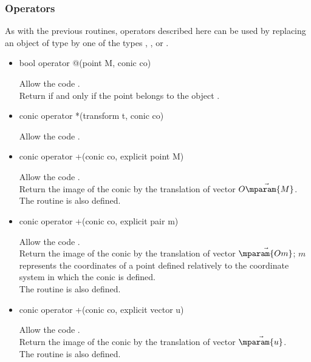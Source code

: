 \documentclass[pdftex]{article}
\newcommand{\ssi}{if and only if\xspace}
\begin{document}
\subsubsection{Operators}
As with the previous routines, operators described here can be used by
replacing an object of type  by one of the types
, ,  or .
\begin{itemize}
\item {}
  \begin{Vcolor}
    bool operator @(point M, conic co)
  \end{Vcolor}
  Allow the code .\\
  Return  \ssi the point  belongs to the
  object .
\item {}
  \begin{Vcolor}
    conic operator *(transform t, conic co)
  \end{Vcolor}
  Allow the code .
\item {}
  \begin{Vcolor}
    conic operator +(conic co, explicit point M)
  \end{Vcolor}
  Allow the code .\\
  Return the image of the conic  by the translation of
  vector $\vec{O\mparam{M}}$.\\
  The routine  is also defined.
\item {}
  \begin{Vcolor}
    conic operator +(conic co, explicit pair m)
  \end{Vcolor}
  Allow the code .\\
  Return the image of the conic  by the translation of
  vector $\vec{\mparam{Om}}$; $m$ represents the coordinates of a point
  defined relatively to the coordinate system in which the conic is
  defined.\\
  The routine  is also defined.
\item {}
  \begin{Vcolor}
    conic operator +(conic co, explicit vector u)
  \end{Vcolor}
  Allow the code .\\
  Return the image of the conic  by the translation of
  vector $\vec{\mparam{u}}$.\\
  The routine  is also defined.
\end{itemize}
\end{document}
